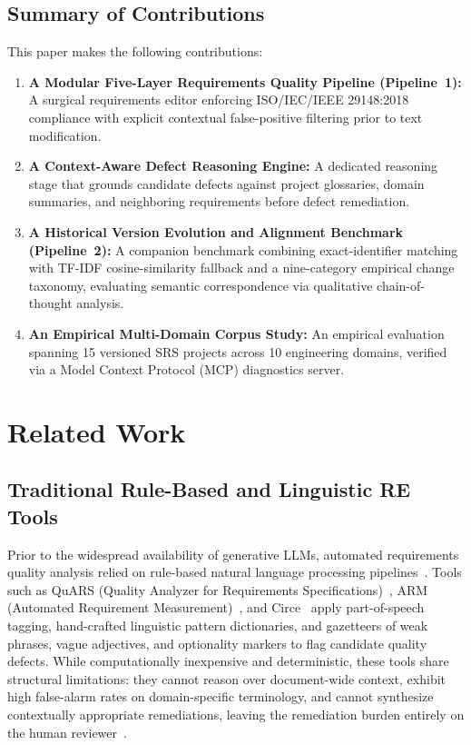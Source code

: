 \documentclass[journal]{IEEEtran}
\begin{document}
\subsection{Summary of Contributions}
\label{sec:contributions}

This paper makes the following contributions:
\begin{enumerate}
    \item \textbf{A Modular Five-Layer Requirements Quality Pipeline (Pipeline~1):} A surgical requirements editor enforcing ISO/IEC/IEEE 29148:2018 compliance with explicit contextual false-positive filtering prior to text modification.
    \item \textbf{A Context-Aware Defect Reasoning Engine:} A dedicated reasoning stage that grounds candidate defects against project glossaries, domain summaries, and neighboring requirements before defect remediation.
    \item \textbf{A Historical Version Evolution and Alignment Benchmark (Pipeline~2):} A companion benchmark combining exact-identifier matching with TF-IDF cosine-similarity fallback and a nine-category empirical change taxonomy, evaluating semantic correspondence via qualitative chain-of-thought analysis.
    \item \textbf{An Empirical Multi-Domain Corpus Study:} An empirical evaluation spanning 15 versioned SRS projects across 10 engineering domains, verified via a Model Context Protocol (MCP) diagnostics server.
\end{enumerate}

\section{Related Work}
\label{sec:related-work}

\subsection{Traditional Rule-Based and Linguistic RE Tools}
\label{sec:related-traditional}

Prior to the widespread availability of generative LLMs, automated requirements quality analysis relied on rule-based natural language processing pipelines~\cite{ferrari2017nlp}. Tools such as QuARS (Quality Analyzer for Requirements Specifications)~\cite{fantechi2002quars}, ARM (Automated Requirement Measurement)~\cite{wilson1997arm}, and Circe~\cite{ambriola1997circe} apply part-of-speech tagging, hand-crafted linguistic pattern dictionaries, and gazetteers of weak phrases, vague adjectives, and optionality markers to flag candidate quality defects. While computationally inexpensive and deterministic, these tools share structural limitations: they cannot reason over document-wide context, exhibit high false-alarm rates on domain-specific terminology, and cannot synthesize contextually appropriate remediations, leaving the remediation burden entirely on the human reviewer~\cite{arora2015automated}.
\end{document}
